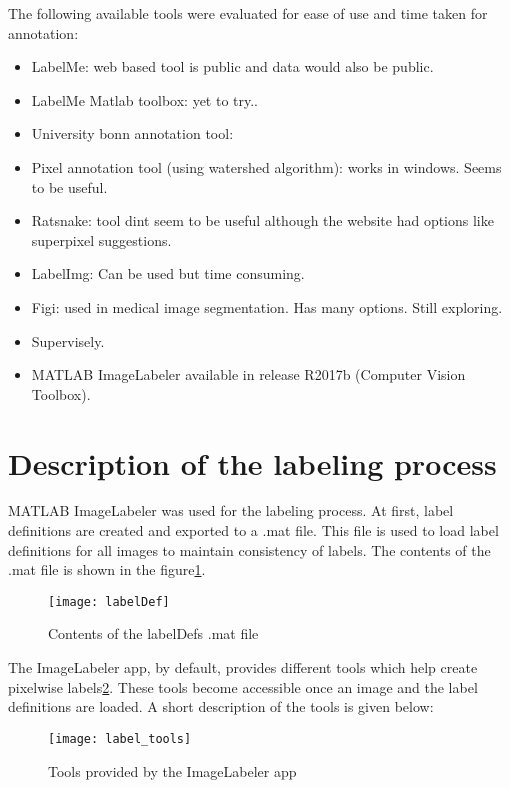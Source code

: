 \documentclass[paper=a4,11pt,parskip=half,toc=listof]{scrartcl}
\begin{document}
The following available tools were evaluated for ease of use and time taken for annotation:
	\begin{itemize}
		\item LabelMe: web based tool is public and data would also be public.
		\item LabelMe Matlab toolbox: yet to try..
		\item University bonn annotation tool:
		\item Pixel annotation tool (using watershed algorithm): works in windows. Seems to be useful.
		\item Ratsnake: tool dint seem to be useful although the website had options like superpixel suggestions.
		\item LabelImg: Can be used but time consuming.
		\item Figi: used in medical image segmentation. Has many options. Still exploring.
		\item Supervisely.
		\item MATLAB ImageLabeler available in release R2017b (Computer Vision Toolbox).
	\end{itemize}

\section{Description of the labeling process}
\label{section:process}
MATLAB ImageLabeler was used for the labeling process. At first, label definitions are created and exported to a .mat file. This file is used to load label definitions for all images to maintain consistency of labels. The contents of the .mat file is shown in the figure\ref{Fig:2}.

	\begin{figure}[htb!]
		\centering
		\texttt{[image: labelDef]}
		\caption{Contents of the labelDefs .mat file}
		\label{Fig:2}
	\end{figure}
	
The ImageLabeler app, by default, provides different tools which help create pixelwise labels\ref{Fig:3}. These tools become accessible once an image and the label definitions are loaded. A short description of the tools is given below:
	\begin{figure}[htb!]
		\centering
		\texttt{[image: label\_tools]}
		\caption{Tools provided by the ImageLabeler app}
		\label{Fig:3}
	\end{figure}
	
\end{document}
